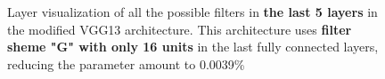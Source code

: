 \begin{figure}[!h]
\centering
\caption{Layer visualization of all the possible filters in \textbf{the last 5 layers} in the modified VGG13 architecture. This architecture uses \textbf{filter sheme "G" with only 16 units} in the last fully connected layers, reducing the parameter amount to 0.0039\%}


\end{figure}
